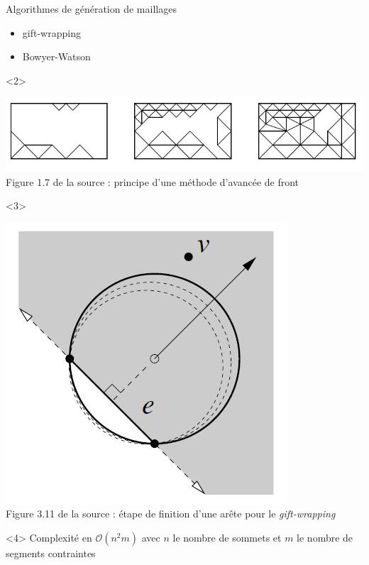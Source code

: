 \documentclass[aspectratio=169, 12pt, a4paper, hyperref={pdfauthor={Alexandre MARIN}, pdfkeywords={IFPEN, Delaunay, Voronoi, mesh generation}, colorlinks=true, linkcolor=purple, urlcolor=blue, citecolor=magenta}]{beamer}
\begin{document}
\begin{Energie}{Algorithmes de génération de maillages}

\begin{itemize}
\item<1-4> gift-wrapping
\item<1,5,6> Bowyer-Watson
\end{itemize}
\begin{onlyenv}<2>
\begin{center}
\includegraphics[scale=0.7]{advancingFront.jpg}
\\Figure 1.7 de la source \cite{delnotes} : principe d'une méthode d'avancée de front
\end{center}
\end{onlyenv}
\begin{onlyenv}<3>
\begin{center}
\includegraphics[scale=0.5]{giftWrappingStep.jpg}
\\Figure 3.11 de la source \cite{delnotes} : étape de finition d'une arête pour le \emph{gift-wrapping}
\end{center}
\end{onlyenv}
\begin{onlyenv}<4>\vspace{1cm}
Complexité en $\mathcal{O}(n^{2}m)$ avec $n$ le nombre de sommets et $m$ le nombre de segments contraintes
\end{onlyenv}


\end{Energie}
\end{document}
